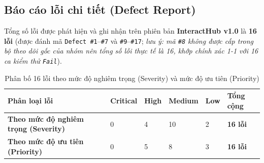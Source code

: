 \documentclass[11pt,a4paper]{article}
\begin{document}
\subsection{Báo cáo lỗi chi tiết (Defect Report)}
Tổng số lỗi được phát hiện và ghi nhận trên phiên bản \textbf{InteractHub v1.0} là \textbf{16 lỗi} (được đánh mã \texttt{Defect \#1}--\texttt{\#7} và \texttt{\#9}--\texttt{\#17}; \textit{lưu ý: mã \texttt{\#8} không được cấp trong bộ theo dõi gốc của nhóm nên tổng số lỗi thực tế là 16, khớp chính xác 1-1 với 16 ca kiểm thử \texttt{Fail}}).

\begin{table}[H]
\centering
\small
\begin{tabularx}{\textwidth}{|L{4.0cm}|C{2.0cm}|C{2.0cm}|C{2.0cm}|C{2.0cm}|X|}
\hline
{}
\textbf{Phân loại lỗi} & \textbf{Critical} & \textbf{High} & \textbf{Medium} & \textbf{Low} & \textbf{Tổng cộng} \tabularnewline
\hline
\textbf{Theo mức độ nghiêm trọng (Severity)} & 0 & 4 & 10 & 2 & \textbf{16 lỗi} \\ \hline
\textbf{Theo mức độ ưu tiên (Priority)} & 0 & 5 & 8 & 3 & \textbf{16 lỗi} \\ \hline
\end{tabularx}
\caption{Phân bố 16 lỗi theo mức độ nghiêm trọng (Severity) và mức độ ưu tiên (Priority)}
\end{table}
\end{document}
